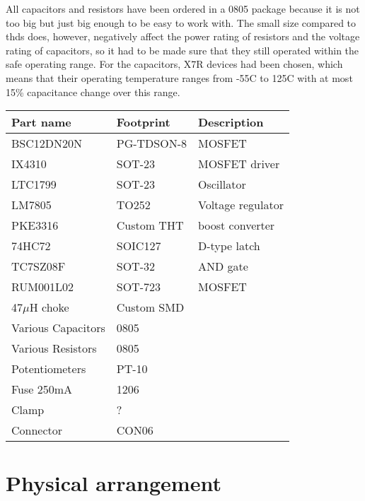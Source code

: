 All capacitors and resistors have been ordered in a 0805 package because it is not too big but just big enough to be easy to work with. The small size compared to \glspl{thd} does, however, negatively affect the power rating of resistors and the voltage rating of capacitors, so it had to be made sure that they still operated within the safe operating range. For the capacitors, X7R devices had been chosen, which means that their operating temperature ranges from -55\textdegree C to 125\textdegree C with at most 15\% capacitance change over this range\textsuperscript{}.






\begin{tabular}{@{}lll@{}}
    \toprule
    \textbf{Part name} & \textbf{Footprint} & \textbf{Description}\\\midrule
    BSC12DN20N & PG-TDSON-8 & MOSFET\\
    IX4310 & SOT-23 & MOSFET driver\\
    LTC1799 & SOT-23 & Oscillator\\
    LM7805 & TO252 & Voltage regulator\\
    PKE3316 & Custom THT & boost converter\\
    74HC72 & SOIC127 & D-type latch\\
    TC7SZ08F & SOT-32 & AND gate\\
    RUM001L02 & SOT-723 & MOSFET\\
    47\(\mu\)H choke & Custom SMD &\\
    Various Capacitors & 0805 &\\
    Various Resistors & 0805 &\\
    Potentiometers & PT-10&\\
    Fuse 250mA & 1206 &\\
    Clamp & ? &\\
    Connector & CON06 &\\
    \bottomrule
\end{tabular}

\section{Physical arrangement}
\label{sec:physical-arrangement}

